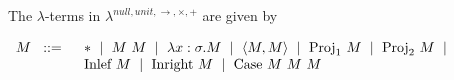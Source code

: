 The $ \lambda $-terms in $ \lambda ^{ null, unit, \to , \times , + } $ are given by
\begin{center}
$
\begin{array}{rl}
M \hspace*{6pt} ::= \hspace*{6pt} & \ast \hspace*{6pt} | \hspace*{6pt} M \text{ } M \hspace*{6pt} | \hspace*{6pt} \lambda x: \sigma .M \hspace*{6pt} | \hspace*{6pt} \langle M,M \rangle \hspace*{6pt} | \hspace*{6pt} \text{Proj}_1 \text{ } M \hspace*{6pt} | \hspace*{6pt} \text{Proj}_2 \text{ } M \hspace*{6pt} | \\
  & \text{Inlef} \text{ } M \hspace*{6pt} | \hspace*{6pt} \text{Inright} \text{ } M \hspace*{6pt} | \hspace*{6pt} \text{Case} \text{ } M \text{ } M \text{ } M
\end{array}
$
\end{center}